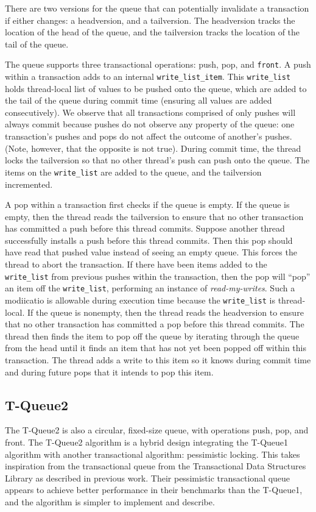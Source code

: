 There are two versions for the queue that can potentially invalidate a transaction if either changes: a headversion, and a tailversion. The headversion tracks the location of the head of the queue, and the tailversion tracks the location of the tail of the queue.

The queue supports three transactional operations: push, pop, and \texttt{front}. A push within a transaction adds to an internal \texttt{write\_list\_item}. This \texttt{write\_list} holds thread-local list of values to be pushed onto the queue, which are added to the tail of the queue during commit time (ensuring all values are added consecutively). We observe that all transactions comprised of only pushes will always commit because pushes do not observe any property of the queue: one transaction's pushes and pops do not affect the outcome of another's pushes. (Note, however, that the opposite is not true). During commit time, the thread locks the tailversion so that no other thread's push can push onto the queue. The items on the \texttt{write\_list} are added to the queue, and the tailversion incremented.

A pop within a transaction first checks if the queue is empty. If the queue is empty, then the thread reads the tailversion to ensure that no other transaction has committed a push before this thread commits. Suppose another thread successfully installs a push before this thread commits. Then this pop should have read that pushed value instead of seeing an empty queue. This forces the thread to abort the transaction. If there have been items added to the \texttt{write\_list} from previous pushes within the transaction, then the pop will “pop” an item off the \texttt{write\_list}, performing an instance of \emph{read-my-writes}. Such a modiicatio is allowable during execution time because the \texttt{write\_list} is thread-local. If the queue is nonempty, then the thread reads the headversion to ensure that no other transaction has committed a pop before this thread commits. The thread then finds the item to pop off the queue by iterating through the queue from the head until it finds an item that has not yet been popped off within this transaction. The thread adds a write to this item so it knows during commit time and during future pops that it intends to pop this item.


\subsection{T-Queue2}
The T-Queue2 is also a circular, fixed-size queue, with operations push, pop, and front. The T-Queue2 algorithm is a hybrid design integrating the T-Queue1 algorithm with another transactional algorithm: pessimistic locking. This takes inspiration from the transactional queue from the Transactional Data Structures Library\cite{tdsl} as described in previous work. Their pessimistic transactional queue appears to achieve better performance in their benchmarks than the T-Queue1, and the algorithm is simpler to implement and describe. 

